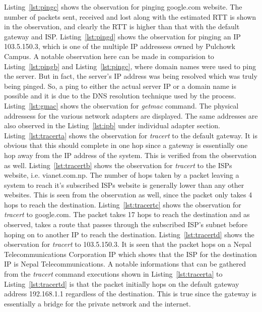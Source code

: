 \documentclass{lab_sheet}
\begin{document}
    Listing~\ref{lst:pingc} shows the observation for pinging google.com website. The number of packets sent, received and lost along with the estimated RTT is shown in the observation, and clearly the RTT is higher than that with the default gateway and ISP. 
    Listing~\ref{lst:pingd} shows the observation for pinging an IP 103.5.150.3, which is one of the multiple IP addressess owned by Pulchowk Campus. A notable observation here can be made in comparision to Listing~\ref{lst:pingb} and Listing~\ref{lst:pingc}, where domain names were used to ping the server. But in fact, the server's IP address was being resolved which was truly being pinged. So, a ping to either the actual server IP or a domain name is possible and it is due to the DNS resolution technique used by the process. 
    Listing~\ref{lst:gmac} shows the observation for \textit{getmac} command. The physical addressess for the various network adapters are displayed. The same addresses are also observed in the Listing~\ref{lst:ipb} under individual adapter section.
    Listing~\ref{lst:tracerta} shows the observation for \textit{tracert} to the default gateway. It is obvious that this should complete in one hop since a gateway is essentially one hop away from the IP address of the system. This is verified from the observation as well.
    Listing~\ref{lst:tracertb} shows the observation for \textit{tracert} to the ISPs website, i.e. vianet.com.np. The number of hops taken by a packet leaving a system to reach it's subscribed ISPs website is generally lower than any other websites. This is seen from the observation as well, since the packet only takes 4 hops to reach the destination.
    Listing~\ref{lst:tracertc} shows the observation for \textit{tracert} to google.com. The packet takes 17 hops to reach the destination and as observed, takes a route that passes through the subscribed ISP's subnet before hoping on to another IP to reach the destination. 
    Listing~\ref{lst:tracertd} shows the observation for \textit{tracert} to 103.5.150.3. It is seen that the packet hops on a Nepal Telecommunications Corporation IP which shows that the ISP for the destination IP is Nepal Telecommunications.
    A notable informations that can be gathered from the \textit{tracert} command executions shown in Listing~\ref{lst:tracerta} to Listing~\ref{lst:tracertd} is that the packet initially hops on the default gateway address 192.168.1.1 regardless of the destination. This is true since the gateway is essentially a bridge for the private network and the internet.
\end{document}

